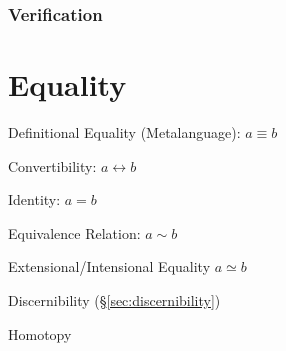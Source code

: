 \subsubsection{Verification}\label{sec:verification}



\section{Equality}\label{sec:equality}\cite{baez15}

Definitional Equality (Metalanguage): $a \equiv b$

Convertibility: $a \leftrightarrow b$

Identity: $a = b$

Equivalence Relation: $a \sim b$

Extensional/Intensional Equality $a \simeq b$

Discernibility (\S\ref{sec:discernibility})

Homotopy



